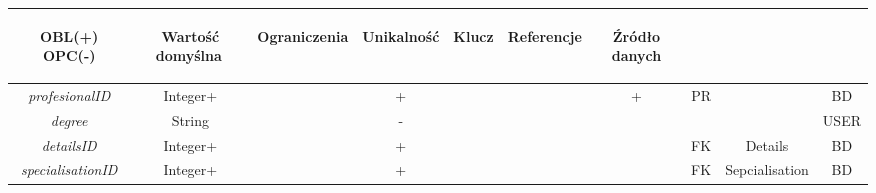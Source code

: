 \documentclass[12pt,twoside]{report}
\begin{document}
\begin{enumerate}[start=1,label={\bfseries REL\textbackslash0\arabic*}]
\begin{table}[H]
\begin{tabular}{|c|c|c|c|c|c|c|c|c|c|}
		\begin{sideways}OBL(+) OPC(-)\end{sideways} & 
		\begin{sideways}Wartość domyślna$\ $\end{sideways}& 
		\begin{sideways}Ograniczenia\end{sideways} &
		\begin{sideways}Unikalność \end{sideways}& 
		\begin{sideways}Klucz \end{sideways}& 
		\begin{sideways}Referencje \end{sideways}&
		\begin{sideways}Źródło danych\end{sideways}\\
		\hline
		\textit{profesionalID}&Integer+&&+&&&+&PR&&BD\\
		\hline
		\textit{degree}&String&&-&&&&&&USER\\
		\hline
		\textit{detailsID}&Integer+&&+&&&&FK&Details&BD\\
		\hline
		\textit{specialisationID}&Integer+&&+&&&&FK&Sepcialisation&BD\\
		\hline
	\end{tabular}
\end{table}


\end{enumerate}
\end{document}
